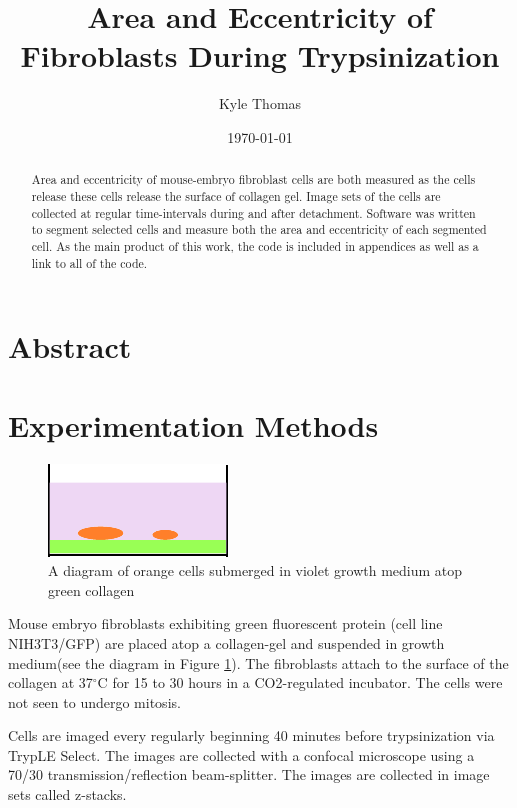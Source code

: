 \documentclass[ twocolumn,notitlepage]{ revtex4-1}
\begin{document}
\title{Area and Eccentricity of Fibroblasts During Trypsinization}\author{Kyle Thomas}\date{\today}\maketitle

\onecolumngrid
\section*{Abstract}
\begin{abstract}
\begin{center}
Area and eccentricity of mouse-embryo fibroblast cells are both measured as the cells release these cells release the surface of collagen gel. Image sets of the cells are collected at regular time-intervals during and after detachment. Software was written to segment selected cells and measure both the area and eccentricity of each segmented cell. As the main product of this work, the code is included in appendices as well as a link to all of the code.
\end{center}
\end{abstract}
\twocolumngrid

\section*{Experimentation Methods}
\begin{figure}
  \centering
  \caption{\label{fig:cellDiagram}A diagram of orange cells submerged in violet growth medium atop green collagen}
  \includegraphics[clip=true,width=.4\textwidth]{img/cells-diagram}
\end{figure}

Mouse embryo fibroblasts exhibiting green fluorescent protein (cell line NIH3T3/GFP) are placed atop a collagen-gel and suspended in growth medium(see the diagram in Figure \ref{fig:cellDiagram}). The fibroblasts attach to the surface of the collagen at 37$^\circ$C for 15 to 30 hours in a CO2-regulated incubator. The cells were not seen to undergo mitosis.

Cells are imaged every regularly beginning 40 minutes before trypsinization via TrypLE Select. The images are collected with a confocal microscope using a 70/30 transmission/reflection beam-splitter. The images are collected in image sets called z-stacks.
\end{document}
